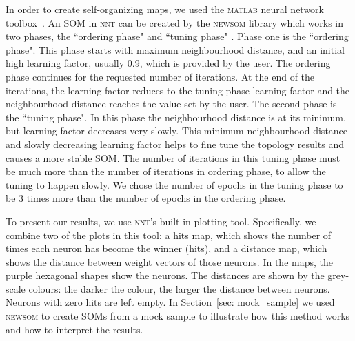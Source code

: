      In order to create self-organizing maps, we used the \textsc{matlab} neural network toolbox~\citep[NNT,][]{matlabtolbox}.
     An SOM in \textsc{nnt} can be created by the \textsc{newsom} library which works in two phases, the ``ordering phase" and ``tuning phase" . 
     Phase one is the ``ordering phase". 
     This phase starts with maximum neighbourhood distance, and an initial high learning factor, usually 0.9, which is provided by the user. 
     The ordering phase continues for the requested number of iterations.
     At the end of the iterations, the learning factor reduces to the tuning phase learning factor and the neighbourhood distance reaches the value set by the user. 
     The second phase is the ``tuning phase".
     In this phase the neighbourhood distance is at its minimum, but learning factor decreases very slowly.
     This minimum neighbourhood distance and slowly decreasing learning factor helps to fine tune the topology results and causes a more stable SOM. 
     The number of iterations in this tuning phase must be much more than the number of iterations in ordering phase, to allow the tuning to happen slowly. 
     We chose the number of epochs in the tuning phase to be 3 times more than the number of epochs in the ordering phase.
     
     To present our results, we use \textsc{nnt}'s built-in plotting tool.
     Specifically, we combine two of the plots in this tool: a hits map, which shows the number of times each neuron has become the winner (hits), and a distance map, which shows the distance between weight vectors of those neurons.
     In the maps, the purple hexagonal shapes show the neurons. 
     The distances are shown by the grey-scale colours: the darker the colour, the larger the distance between neurons.
     Neurons with zero hits are left empty.
     In Section~\ref{sec: mock_sample} we used \textsc{newsom} to create SOMs from a mock sample to illustrate how this method works and how to interpret the results.

